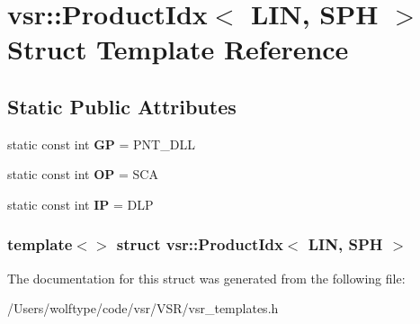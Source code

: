 \hypertarget{structvsr_1_1_product_idx_3_01_l_i_n_00_01_s_p_h_01_4}{\section{vsr\-:\-:Product\-Idx$<$ L\-I\-N, S\-P\-H $>$ Struct Template Reference}
\label{structvsr_1_1_product_idx_3_01_l_i_n_00_01_s_p_h_01_4}
}
\subsection*{Static Public Attributes}
\begin{DoxyCompactItemize}
\item 
\hypertarget{structvsr_1_1_product_idx_3_01_l_i_n_00_01_s_p_h_01_4_a1b0e8a8ee989c1bfd2d44b3bf5ef2319}{static const int {\bfseries G\-P} = P\-N\-T\-\_\-\-D\-L\-L}\label{structvsr_1_1_product_idx_3_01_l_i_n_00_01_s_p_h_01_4_a1b0e8a8ee989c1bfd2d44b3bf5ef2319}

\item 
\hypertarget{structvsr_1_1_product_idx_3_01_l_i_n_00_01_s_p_h_01_4_aec98430a2d0be4b07ee29022afc2a474}{static const int {\bfseries O\-P} = S\-C\-A}\label{structvsr_1_1_product_idx_3_01_l_i_n_00_01_s_p_h_01_4_aec98430a2d0be4b07ee29022afc2a474}

\item 
\hypertarget{structvsr_1_1_product_idx_3_01_l_i_n_00_01_s_p_h_01_4_ac412e87d2fb663dcf345e145cec9a885}{static const int {\bfseries I\-P} = D\-L\-P}\label{structvsr_1_1_product_idx_3_01_l_i_n_00_01_s_p_h_01_4_ac412e87d2fb663dcf345e145cec9a885}

\end{DoxyCompactItemize}
\subsubsection*{template$<$$>$ struct vsr\-::\-Product\-Idx$<$ L\-I\-N, S\-P\-H $>$}



The documentation for this struct was generated from the following file\-:\begin{DoxyCompactItemize}
\item 
/\-Users/wolftype/code/vsr/\-V\-S\-R/vsr\-\_\-templates.\-h\end{DoxyCompactItemize}
